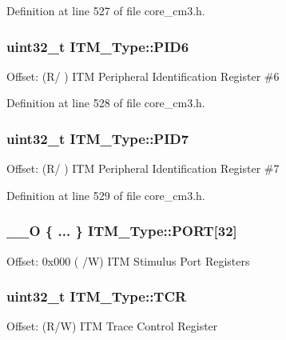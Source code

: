 \-Definition at line 527 of file core\-\_\-cm3.\-h.

\hypertarget{struct_i_t_m___type_a755c0ec919e7dbb5f7ff05c8b56a3383}{
\subsubsection[{\-P\-I\-D6}]{ uint32\-\_\-t {\bf \-I\-T\-M\-\_\-\-Type\-::\-P\-I\-D6}}}\label{struct_i_t_m___type_a755c0ec919e7dbb5f7ff05c8b56a3383}
\-Offset\-: (\-R/ ) \-I\-T\-M \-Peripheral \-Identification \-Register \#6 

\-Definition at line 528 of file core\-\_\-cm3.\-h.

\hypertarget{struct_i_t_m___type_aa31ca6bb4b749201321b23d0dbbe0704}{
\subsubsection[{\-P\-I\-D7}]{ uint32\-\_\-t {\bf \-I\-T\-M\-\_\-\-Type\-::\-P\-I\-D7}}}\label{struct_i_t_m___type_aa31ca6bb4b749201321b23d0dbbe0704}
\-Offset\-: (\-R/ ) \-I\-T\-M \-Peripheral \-Identification \-Register \#7 

\-Definition at line 529 of file core\-\_\-cm3.\-h.

\hypertarget{struct_i_t_m___type_afe056e8c8f8c5519d9b47611fa3a4c46}{
\subsubsection[{\-P\-O\-R\-T}]{\setlength{\rightskip}{0pt plus 5cm}\-\_\-\-\_\-\-O \{ ... \}    {\bf \-I\-T\-M\-\_\-\-Type\-::\-P\-O\-R\-T}\mbox{[}32\mbox{]}}}\label{struct_i_t_m___type_afe056e8c8f8c5519d9b47611fa3a4c46}
\-Offset\-: 0x000 ( /\-W) \-I\-T\-M \-Stimulus \-Port \-Registers \hypertarget{struct_i_t_m___type_a58f169e1aa40a9b8afb6296677c3bb45}{
\subsubsection[{\-T\-C\-R}]{ uint32\-\_\-t {\bf \-I\-T\-M\-\_\-\-Type\-::\-T\-C\-R}}}\label{struct_i_t_m___type_a58f169e1aa40a9b8afb6296677c3bb45}
\-Offset\-: (\-R/\-W) \-I\-T\-M \-Trace \-Control \-Register 

